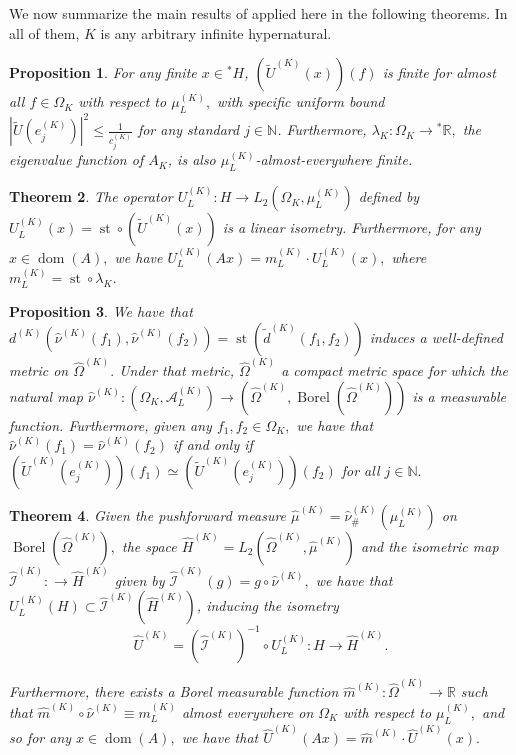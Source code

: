 \documentclass{amsart}
\newtheorem{thm}{Theorem}[section]
\newtheorem{prop}[thm]{Proposition}
\theoremstyle{definition}
\theoremstyle{remark}
\def \Dom{\operatorname{dom}}
\def \St{\operatorname{st}}
\def \Borel{\operatorname{Borel}}
\def \HOM{\hat{\Omega}}
\def \HMU{\hat{\mu}}
\def \HNU{\hat{\nu}}
\def \HU{\hat{U}}
\def \Hm{\hat{m}}
\begin{document}
We now summarize the main results of \cite{nonez2024spectralequivalencesnonstandardsamplings} applied here in the following theorems. In all of them, $K$ is any arbitrary infinite hypernatural. 

\begin{prop}\label{proposition_nonstandard_limited_isometry}
	For any finite $x\in {}^*H$, $(\tilde{U}^{(K)}(x))(f)$ is finite for almost all $f\in\Omega_K$ with respect to $\mu_L^{(K)},$ with specific uniform bound $|\tilde{U}(e_j^{(K)})|^2\leq\frac{1}{c_j^{(K)}}$ for any standard $j\in\mathbb{N}$. Furthermore, $\lambda_K:\Omega_K\rightarrow{}^*\mathbb{R},$ the eigenvalue function of $A_K$, is also $\mu_L^{(K)}$-almost-everywhere finite.
\end{prop}
\begin{thm}\label{theorem_nonstandard_spectral_Loeb}	
	The operator $U_L^{(K)}:H\rightarrow L_2(\Omega_K,\mu_L^{(K)})$ defined by $U_L^{(K)}(x)=\St\circ \left(\tilde{U}^{(K)}(x)\right)$  is a linear isometry. Furthermore, for any $x\in\Dom(A),$ we have $U_L^{(K)}(Ax)=m_L^{(K)}\cdot U_L^{(K)}(x),$ where $m_L^{(K)}=\St\circ\lambda_K.$
\end{thm}
\begin{prop}\label{proposition_nonstandard_hull_compact}	
	We have that $d^{(K)}(\HNU^{(K)}(f_1),\HNU^{(K)}(f_2))=\St(\tilde{d}^{(K)}(f_1,f_2))$ induces a well-defined metric on $\HOM^{(K)}.$ Under that metric, $\HOM^{(K)}$ a compact metric space for which the natural map $\HNU^{(K)}:(\Omega_K,\mathcal{A}_L^{(K)})\rightarrow(\HOM^{(K)},\Borel(\HOM^{(K)}))$ is a measurable function. Furthermore, given any $f_1,f_2\in\Omega_K,$ we have that $\HNU^{(K)}(f_1)=\HNU^{(K)}(f_2)$ if and only if $(\tilde{U}^{(K)}(e_j^{(K)}))(f_1)\simeq(\tilde{U}^{(K)}(e_j^{(K)}))(f_2)$ for all $j\in\mathbb{N}.$
\end{prop}
\begin{thm}\label{theorem_nonstandard_spectral_hull}
	Given the pushforward measure $\HMU^{(K)}=\HNU^{(K)}_{\#}(\mu_L^{(K)})$ on $\Borel(\HOM^{(K)}),$ the space $\hat{H}^{(K)}=L_2(\HOM^{(K)}, \HMU^{(K)})$ and the isometric map $\hat{\mathcal{I}}^{(K)}:\rightarrow \hat{H}^{(K)}$ given by $\hat{\mathcal{I}}^{(K)}(g)=g\circ\HNU^{(K)},$ we have that $U_L^{(K)}(H)\subset\hat{\mathcal{I}}^{(K)}(\hat{H}^{(K)})$, inducing the isometry $$\HU^{(K)}=(\hat{\mathcal{I}}^{(K)})^{-1}\circ U_L^{(K)} :H\rightarrow  \hat{H}^{(K)}.$$ 
	
	Furthermore, there exists a Borel measurable function $\Hm^{(K)}:\HOM^{(K)}\rightarrow \mathbb{R}$ such that $\Hm^{(K)}\circ\HNU^{(K)}\equiv m_L^{(K)}$ almost everywhere on $\Omega_K$ with respect to $\mu_L^{(K)},$ and so for any $x\in\Dom(A),$ we have that $\HU^{(K)}(Ax)=\Hm^{(K)}\cdot \HU^{(K)}(x).$
\end{thm}
\end{document}
